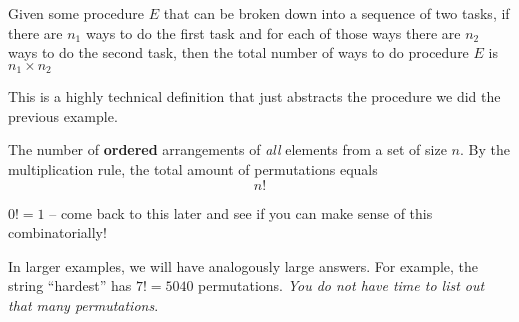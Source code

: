 \documentclass[main.tex]{subfiles}
\begin{document}

\begin{defn}
	Given some procedure \(E\) that can be broken down into a sequence of two tasks, if there are \(n_1\) ways to do the first task and for each of those ways there are \(n_2\) ways to do the second task, then the total number of ways to do procedure \(E\) is \(n_1 \times n_2\)
\end{defn}

\begin{rem}
	This is a highly technical definition that just abstracts the procedure we did the previous example.
\end{rem}

\begin{defn}
	The number of \textbf{ordered} arrangements of \textit{all} elements from a set of size \(n\). By the multiplication rule, the total amount of permutations equals \[n!\]
\end{defn}

\begin{rem}
	\(0! = 1\) -- come back to this later and see if you can make sense of this combinatorially!
\end{rem}


\begin{rem}
	In larger examples, we will have analogously large answers. For example, the string ``hardest'' has \(7! = 5040\) permutations. \textit{You do not have time to list out that many permutations}.
\end{rem}
\end{document}
